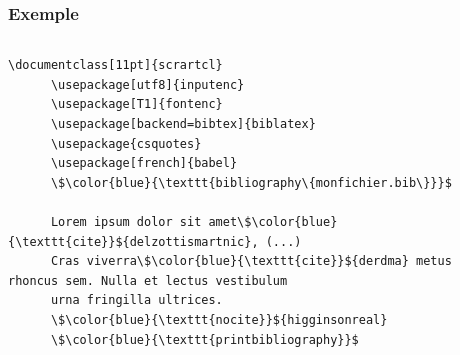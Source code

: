 \begin{frame}[fragile]
  \frametitle{Exemple}
  \begin{columns}
    \begin{column}{0.5\textwidth}
      \begin{lstlisting}[style=nonumbers,mathescape]
      \documentclass[11pt]{scrartcl}
      \usepackage[utf8]{inputenc}
      \usepackage[T1]{fontenc}
      \usepackage[backend=bibtex]{biblatex}
      \usepackage{csquotes}
      \usepackage[french]{babel}
      \$\color{blue}{\texttt{bibliography\{monfichier.bib\}}}$
      
      Lorem ipsum dolor sit amet\$\color{blue}{\texttt{cite}}${delzottismartnic}, (...)
      Cras viverra\$\color{blue}{\texttt{cite}}${derdma} metus rhoncus sem. Nulla et lectus vestibulum
      urna fringilla ultrices.
      \$\color{blue}{\texttt{nocite}}${higginsonreal}
      \$\color{blue}{\texttt{printbibliography}}$
      
          \end{lstlisting}
    \end{column}
    \begin{column}{0.5\textwidth}
      \centering
    \end{column}
  \end{columns}
  

\end{frame}
